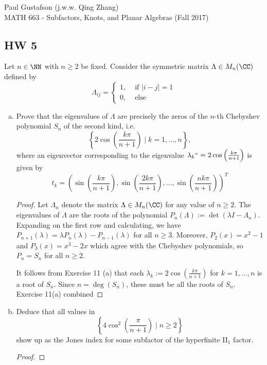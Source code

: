 \documentclass{article}
\begin{document}
\noindent Paul Gustafson (j.w.w. Qing Zhang) \\
\noindent MATH 663 - Subfactors, Knots, and Planar Algebras (Fall 2017)

\subsection*{HW 5}
 Let $n \in \NN$ with $n \ge 2$ be fixed.  Consider the symmetric matrix $\Lambda \in M_n(\CC)$ defined by
$$ \Lambda_{ij} = \begin{cases}
  1, & \text{ if } |i - j| = 1 \\
  0, & \text{ else}
\end{cases} $$
\begin{enumerate}[(a)]
\item Prove that the eigenvalues of $\Lambda$ are precisely the zeros of the $n$-th Chebyshev polynomial $S_n$ of the second kind, i.e.
  $$ \left\{ 2 \cos\left(\frac{k \pi}{n + 1} \right) \mid k = 1, \ldots, n \right\}, $$
  where an eigenvector corresponding to the eigenvalue $\lambda_k ``= 2 \cos \left( \frac{k \pi}{n + 1} \right)$ is given by
  $$t_k = \left( \sin\left( \frac{k \pi}{n + 1} \right),  \sin\left( \frac{2k \pi}{n + 1} \right), \ldots, \sin\left( \frac{nk \pi}{n + 1} \right) \right)^T$$

  \begin{proof}
    Let $\Lambda_n$ denote the matrix $\Lambda \in M_n(\CC)$ for any value of $n \ge 2$.  The eigenvalues of $\Lambda$ are the roots of the polynomial
    $P_n(\Lambda) := \det(\lambda I - \Lambda_n)$.  Expanding on the first row and calculating, we have $P_{n+1}(\lambda) = \lambda P_{n}(\lambda) - P_{n-1}(\lambda)$ for all $n \ge 3$. Moreover, $P_2(x) = x^2 - 1$ and $P_3(x) = x^3 - 2x$ which agree with the Chebyshev polynomials, so $P_n = S_n$ for all $n \ge 2$.

    It follows from Exercise 11 (a) that each $\lambda_k := 2 \cos \left( \frac{k \pi}{n + 1} \right)$ for $k = 1, \ldots, n$ is a root of $S_n$.  Since $n = \deg(S_n)$, these must be all the roots of $S_n$.  Exercise 11(a) combined
  \end{proof}
  
\item Deduce that all values in
  $$\left\{ 4 \cos^2 \left( \frac{\pi}{n + 1} \right) \mid n \ge 2 \right\}$$
show up as the Jones index for some subfactor of the hyperfinite II$_1$ factor.
\begin{proof}
    
    
  \end{proof}
\end{enumerate}
\end{document}
